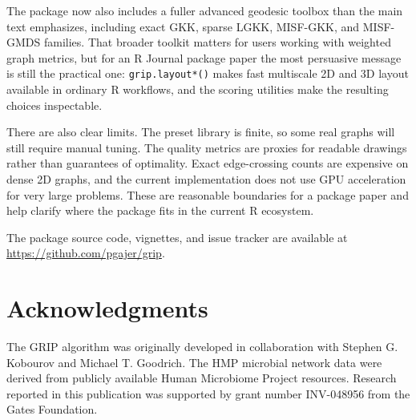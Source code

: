 The package now also includes a fuller advanced geodesic toolbox than the main
text emphasizes, including exact GKK, sparse LGKK, MISF-GKK, and MISF-GMDS
families. That broader toolkit matters for users working with weighted graph
metrics, but for an R Journal package paper the most persuasive message is
still the practical one: \texttt{grip.layout*()} makes fast multiscale 2D and 3D
layout available in ordinary R workflows, and the scoring utilities make the
resulting choices inspectable.

There are also clear limits. The preset library is finite, so some real graphs
will still require manual tuning. The quality metrics are proxies for readable
drawings rather than guarantees of optimality. Exact edge-crossing counts are
expensive on dense 2D graphs, and the current implementation does not use GPU
acceleration for very large problems. These are reasonable boundaries for a
package paper and help clarify where the package fits in the current R
ecosystem.

The package source code, vignettes, and issue tracker are available at
\url{https://github.com/pgajer/grip}.

\section{Acknowledgments}\label{acknowledgments}

The GRIP algorithm was originally developed in collaboration with Stephen G.
Kobourov and Michael T. Goodrich. The HMP microbial network data were derived
from publicly available Human Microbiome Project resources. Research reported
in this publication was supported by grant number INV-048956 from the Gates
Foundation.



\address{%
Pawel Gajer\\
Center for Advanced Microbiome Research and Innovation (CAMRI), Institute for Genome Sciences, Department of Microbiology and Immunology, University of Maryland School of Medicine\\%
Baltimore, Maryland, USA\\
%
%
%
\href{mailto:pgajer@gmail.com}{\nolinkurl{pgajer@gmail.com}}%
}

\address{%
Jacques Ravel\\
Center for Advanced Microbiome Research and Innovation (CAMRI), Institute for Genome Sciences, Department of Microbiology and Immunology, University of Maryland School of Medicine\\%
Baltimore, Maryland, USA\\
%
%
%
%
}
